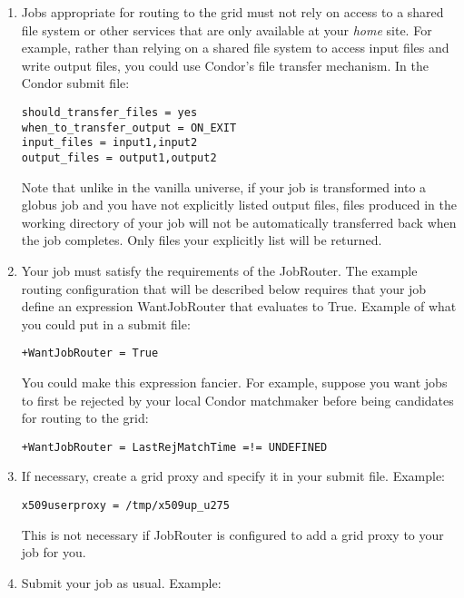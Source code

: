 \begin{enumerate}

\item Jobs appropriate for routing to the grid must not rely on access to
a shared file system or other services that are only available at your
\textit{home} site.  For example, rather than relying on a shared file system
to access input files and write output files, you could use Condor's file
transfer mechanism.  In the Condor submit file:

\begin{verbatim}
should_transfer_files = yes
when_to_transfer_output = ON_EXIT
input_files = input1,input2
output_files = output1,output2
\end{verbatim}

Note that unlike in the vanilla universe, if your job is
transformed into a globus job and you have not explicitly listed
output files, files produced in the working directory of your job will
not be automatically transferred back when the job completes.  Only
files your explicitly list will be returned.

\item Your job must satisfy the requirements of the JobRouter.  The example
routing configuration that will be described below requires that your job
define an expression WantJobRouter that evaluates to True.  Example of
what you could put in a submit file:

\begin{verbatim}
+WantJobRouter = True
\end{verbatim}

You could make this expression fancier.  For example, suppose you want
jobs to first be rejected by your local Condor matchmaker before being
candidates for routing to the grid:

\begin{verbatim}
+WantJobRouter = LastRejMatchTime =!= UNDEFINED
\end{verbatim}

\item If necessary, create a grid proxy and specify it in your submit
file.  Example:

\begin{verbatim}
x509userproxy = /tmp/x509up_u275
\end{verbatim}

This is not necessary if JobRouter is configured to add a grid proxy
to your job for you.

\item Submit your job as usual.  Example:


\end{enumerate}
